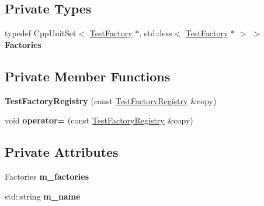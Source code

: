\subsection*{Private Types}
\begin{DoxyCompactItemize}
\item 
typedef Cpp\+Unit\+Set$<$ \hyperlink{class_test_factory}{Test\+Factory} $\ast$, std\+::less$<$ \hyperlink{class_test_factory}{Test\+Factory} $\ast$ $>$ $>$ {\bfseries Factories}\hypertarget{class_test_factory_registry_a64681d64fb637b063b95f67ffb3091f9}{}\label{class_test_factory_registry_a64681d64fb637b063b95f67ffb3091f9}

\end{DoxyCompactItemize}
\subsection*{Private Member Functions}
\begin{DoxyCompactItemize}
\item 
{\bfseries Test\+Factory\+Registry} (const \hyperlink{class_test_factory_registry}{Test\+Factory\+Registry} \&copy)\hypertarget{class_test_factory_registry_a1bf1ca8d85834c3537f167b95e1f38c8}{}\label{class_test_factory_registry_a1bf1ca8d85834c3537f167b95e1f38c8}

\item 
void {\bfseries operator=} (const \hyperlink{class_test_factory_registry}{Test\+Factory\+Registry} \&copy)\hypertarget{class_test_factory_registry_a51390b80712c27e087f10864e14ccabb}{}\label{class_test_factory_registry_a51390b80712c27e087f10864e14ccabb}

\end{DoxyCompactItemize}
\subsection*{Private Attributes}
\begin{DoxyCompactItemize}
\item 
Factories {\bfseries m\+\_\+factories}\hypertarget{class_test_factory_registry_a78a9514f26a1ee0471ee1a3a766427e8}{}\label{class_test_factory_registry_a78a9514f26a1ee0471ee1a3a766427e8}

\item 
std\+::string {\bfseries m\+\_\+name}\hypertarget{class_test_factory_registry_ad98008a2479e935de211ea6f2f5b6d6d}{}\label{class_test_factory_registry_ad98008a2479e935de211ea6f2f5b6d6d}

\end{DoxyCompactItemize}


